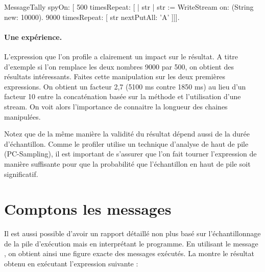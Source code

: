 \documentclass[a4paper,10pt,twoside]{book}
\begin{document}
\begin{code}{}
MessageTally spyOn: 
    [ 500 timesRepeat: [
                    | str |  
                    str := WriteStream on: (String new: 10000). 
                    9000 timesRepeat: [ str nextPutAll: 'A' ]]].
\end{code}

\paragraph{Une exp\'erience.}
L'expression que l'on profile a clairement un impact sur le
r\'esultat. A titre d'exemple si l'on remplace les deux nombres 9000 par 500,
 on obtient des r\'esultats int\'eressants. Faites cette
manipulation sur les deux premi\`eres expressions. 
On obtient un facteur 2,7 (5100 ms contre 1850 ms) au lieu d'un facteur 10
entre la concat\'enation bas\'ee sur la m\'ethode \ct{,} et
l'utilisation d'une stream. On voit alors l'importance de
connaitre la longueur des chaines manipul\'ees. 

Notez que de la m\^eme mani\`ere la validit\'e du r\'esultat d\'epend
aussi de la dur\'ee d'\'echantillon. Comme le profiler utilise un
technique d'analyse de haut de pile (PC-Sampling), il est important de
s'assurer que l'on fait tourner l'expression de mani\`ere suffisante
pour que la probabilit\'e que l'\'echantillon en haut de pile soit significatif.





\section{Comptons les messages}
Il est aussi possible d'avoir un rapport d\'etaill\'e non plus bas\'e
sur l'\'echantillonnage de la pile d'ex\'ecution mais en
interpr\'etant le programme. En utilisant le message ,
on obtient ainsi une figure exacte des messages ex\'ecut\'es. La
 montre le r\'esultat obtenu en ex\'ecutant
l'expression suivante :
\end{document}
